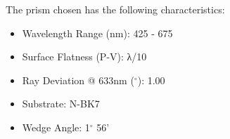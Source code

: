The prism chosen has the following characteristics:
\begin{itemize}
    \item Wavelength Range (nm): 425 - 675
    \item Surface Flatness (P-V): λ/10
    \item Ray Deviation @ 633nm ($^{\circ}$): 1.00
    \item Substrate: N-BK7
    \item Wedge Angle: 1$^{\circ}$ 56'
\end{itemize}
\newpage
